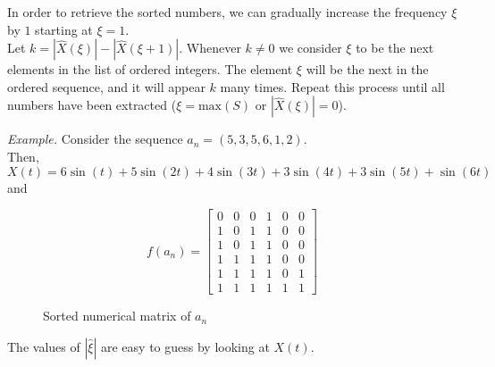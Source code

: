 \documentclass{article}
\begin{document}
In order to retrieve the sorted numbers, we can gradually increase
the frequency \(\xi\) by \(1\) starting at \(\xi=1\). \\
Let \(k=|\hat{X}(\xi)| - |\hat{X}(\xi+1)|\). Whenever \(k \neq 0\)
we consider \(\xi\) to be the next elements in the list of ordered
integers. The element \(\xi\) will be the next in the ordered sequence,
and it will appear \(k\) many times.
Repeat this process until all numbers have been extracted
(\(\xi = \text{max}(S)\) or \(|\hat{X}(\xi)|=0\)).

\textit{Example.} Consider the sequence \(a_n = (5,3,5,6,1,2)\).\\
Then, \(X(t)=6\sin(t) + 5\sin(2t) + 4\sin(3t) + 3\sin(4t)+3\sin(5t)+\sin(6t)\) and

\begin{figure}[ht]
\begin{minipage}{0.5\textwidth}
    \[
        f(a_n) = \begin{bmatrix}
            0 & 0 & 0 & 1 & 0 & 0 \\
            1 & 0 & 1 & 1 & 0 & 0 \\
            1 & 0 & 1 & 1 & 0 & 0 \\
            1 & 1 & 1 & 1 & 0 & 0 \\
            1 & 1 & 1 & 1 & 0 & 1 \\
            1 & 1 & 1 & 1 & 1 & 1
        \end{bmatrix}
    \]
\end{minipage}
\begin{minipage}{0.5\textwidth}
    \centering
    \caption{Sorted numerical matrix of \(a_n\)}
\end{minipage}
\end{figure}

The values of \(|\hat{\xi}|\) are easy to guess by looking at \(X(t)\).

\begin{center}
\end{center}
\end{document}
